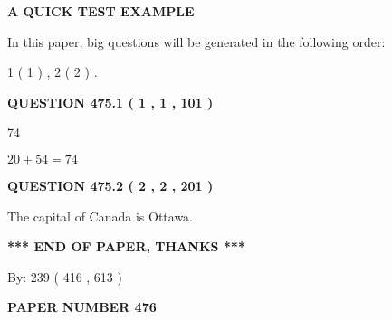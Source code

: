 \documentclass[12pt]{article}
\begin{document}
   
 \vspace{0.2in}
{\LARGE {\textbf{ A QUICK TEST EXAMPLE}}}
   
   
   
\vspace{0.2in}
   
In this paper, big questions will be generated in the following order: 
   
   
   1 ( 1 )
 ,
   2 ( 2 )
 .
  
\vspace{0.2in}
  
{\textbf{\Large{QUESTION
475.1 
 ( 1 , 1 , 101 )
}}}
  
  
 
 
\noindent{}

74
 
 
 
 
\noindent{}

$ %
20 +  %
54=   %
74$
 
 
  
\vspace{0.2in}
  
{\textbf{\Large{QUESTION
475.2 
 ( 2 , 2 , 201 )
}}}
  
  
 
 
\noindent{}
 
 
The capital of Canada is Ottawa.
 
 
 
 
   
   
 \vspace{0.2in}
 
   
   
   
   
\vspace{1.0in} 
{\textbf{\large{ *** END OF PAPER, THANKS *** }}} 
   
   
\hspace{1.0in} By: 
 239 ( 416 ,  613 )
   
   
   
   
\newpage 
\setcounter{page}{ 
   476001 } 
   
   
   
   
 {\textbf{ \Large{ PAPER NUMBER  476  }}}
   
   
\vspace{0.2in}
   
\end{document}
